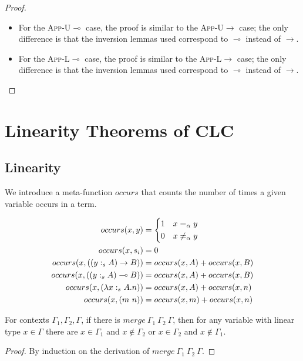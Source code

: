 \documentclass[sigplan,screen,review,anonymous]{acmart}
\newcommand{\rname}[1]{\textsc{\footnotesize #1}}
\newcommand{\stype}[1]{:_#1}
\newcommand{\mrg}[3]{merge\ {#1}\ {#2}\ {#3}}
\begin{document}
\begin{proof}
\begin{itemize}
    \item For the \rname{App-U$\multimap$} case, the proof is similar to the \rname{App-U$\rightarrow$} case; the only difference is that the inversion lemmas used correspond to $\multimap$ instead of $\rightarrow$.
    \item For the \rname{App-L$\multimap$} case, the proof is similar to the \rname{App-L$\rightarrow$} case; the only difference is that the inversion lemmas used correspond to $\multimap$ instead of $\rightarrow$.
  \end{itemize}
\end{proof}

\section{Linearity Theorems of CLC}

\subsection{Linearity}

We introduce a meta-function $occurs$ that counts the number of times a given variable occurs in a term.

\begin{align*}
  occurs(x, y)                               & =
  \begin{dcases}
    1 & x =_\alpha y    \\
    0 & x \neq_\alpha y
  \end{dcases}                                                \\
  occurs(x, s_i)                             & = 0                           \\
  occurs(x, ((y \stype{s} A) \rightarrow B)) & = occurs(x, A) + occurs(x, B) \\
  occurs(x, ((y \stype{s} A) \multimap B))   & = occurs(x, A) + occurs(x, B) \\
  occurs(x, (\lambda x \stype{s} A.n))       & = occurs(x, A) + occurs(x, n) \\
  occurs(x, (m\ n))                          & = occurs(x, m) + occurs(x, n)
\end{align*}

\begin{lemma}\label{islmergeinv}
  For contexts $\Gamma_1, \Gamma_2, \Gamma$, if there is $\mrg{\Gamma_1}{\Gamma_2}{\Gamma}$, then for any variable with linear type $x \in \Gamma$ there are $x \in \Gamma_1$ and $x \notin \Gamma_2$ or $x \in \Gamma_2$ and $x \notin \Gamma_1$.
\end{lemma}
\begin{proof}
  By induction on the derivation of $\mrg{\Gamma_1}{\Gamma_2}{\Gamma}$.
\end{proof}
\end{document}
